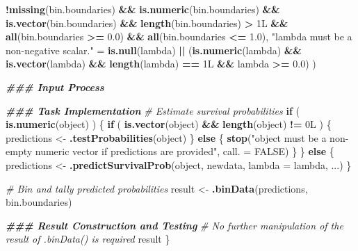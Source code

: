 \documentclass[
]{book}
\newenvironment{Shaded}{\begin{snugshade}}{\end{snugshade}}
\newcommand{\AttributeTok}[1]{\textcolor[rgb]{0.13,0.29,0.53}{#1}}
\newcommand{\CommentTok}[1]{\textcolor[rgb]{0.56,0.35,0.01}{\textit{#1}}}
\newcommand{\ConstantTok}[1]{\textcolor[rgb]{0.56,0.35,0.01}{#1}}
\newcommand{\ControlFlowTok}[1]{\textcolor[rgb]{0.13,0.29,0.53}{\textbf{#1}}}
\newcommand{\DocumentationTok}[1]{\textcolor[rgb]{0.56,0.35,0.01}{\textbf{\textit{#1}}}}
\newcommand{\FloatTok}[1]{\textcolor[rgb]{0.00,0.00,0.81}{#1}}
\newcommand{\FunctionTok}[1]{\textcolor[rgb]{0.13,0.29,0.53}{\textbf{#1}}}
\newcommand{\NormalTok}[1]{#1}
\newcommand{\OtherTok}[1]{\textcolor[rgb]{0.56,0.35,0.01}{#1}}
\newcommand{\SpecialCharTok}[1]{\textcolor[rgb]{0.81,0.36,0.00}{\textbf{#1}}}
\newcommand{\StringTok}[1]{\textcolor[rgb]{0.31,0.60,0.02}{#1}}
\begin{document}
\begin{Shaded}
\begin{Highlighting}[]
      \SpecialCharTok{!}\FunctionTok{missing}\NormalTok{(bin.boundaries) }\SpecialCharTok{\&\&} \FunctionTok{is.numeric}\NormalTok{(bin.boundaries) }\SpecialCharTok{\&\&} 
        \FunctionTok{is.vector}\NormalTok{(bin.boundaries) }\SpecialCharTok{\&\&} \FunctionTok{length}\NormalTok{(bin.boundaries) }\SpecialCharTok{\textgreater{}}\NormalTok{ 1L }\SpecialCharTok{\&\&} 
        \FunctionTok{all}\NormalTok{(bin.boundaries }\SpecialCharTok{\textgreater{}=} \FloatTok{0.0}\NormalTok{) }\SpecialCharTok{\&\&} \FunctionTok{all}\NormalTok{(bin.boundaries }\SpecialCharTok{\textless{}=} \FloatTok{1.0}\NormalTok{),}
    \StringTok{"\textasciigrave{}lambda\textasciigrave{} must be a non{-}negative scalar."} \OtherTok{=} 
      \FunctionTok{is.null}\NormalTok{(lambda) }\SpecialCharTok{||}\NormalTok{ (}\FunctionTok{is.numeric}\NormalTok{(lambda) }\SpecialCharTok{\&\&} \FunctionTok{is.vector}\NormalTok{(lambda) }\SpecialCharTok{\&\&}
                            \FunctionTok{length}\NormalTok{(lambda) }\SpecialCharTok{==}\NormalTok{ 1L }\SpecialCharTok{\&\&}\NormalTok{ lambda }\SpecialCharTok{\textgreater{}=} \FloatTok{0.0}\NormalTok{)}
\NormalTok{  )}
  
  \DocumentationTok{\#\#\# Input Process}
  
  \DocumentationTok{\#\#\# Task Implementation}
  \CommentTok{\# Estimate survival probabilities}
  \ControlFlowTok{if}\NormalTok{ ( }\FunctionTok{is.numeric}\NormalTok{(object) ) \{}
    \ControlFlowTok{if}\NormalTok{ ( }\FunctionTok{is.vector}\NormalTok{(object) }\SpecialCharTok{\&\&} \FunctionTok{length}\NormalTok{(object) }\SpecialCharTok{!=}\NormalTok{ 0L ) \{}
\NormalTok{      predictions }\OtherTok{\textless{}{-}} \FunctionTok{.testProbabilities}\NormalTok{(object)}
\NormalTok{    \} }\ControlFlowTok{else}\NormalTok{ \{}
      \FunctionTok{stop}\NormalTok{(}\StringTok{"\textasciigrave{}object\textasciigrave{} must be a non{-}empty numeric vector if predictions are provided"}\NormalTok{,}
           \AttributeTok{call. =} \ConstantTok{FALSE}\NormalTok{)}
\NormalTok{    \}}
\NormalTok{  \} }\ControlFlowTok{else}\NormalTok{ \{}
\NormalTok{    predictions }\OtherTok{\textless{}{-}} \FunctionTok{.predictSurvivalProb}\NormalTok{(object, newdata, }\AttributeTok{lambda =}\NormalTok{ lambda, ...)}
\NormalTok{  \}}
  
  \CommentTok{\# Bin and tally predicted probabilities}
\NormalTok{  result }\OtherTok{\textless{}{-}} \FunctionTok{.binData}\NormalTok{(predictions, bin.boundaries)}
  
  \DocumentationTok{\#\#\# Result Construction and Testing}
  \CommentTok{\# No further manipulation of the result of .binData() is required}
\NormalTok{  result}
\NormalTok{\}}
\end{Highlighting}
\end{Shaded}
\end{document}

